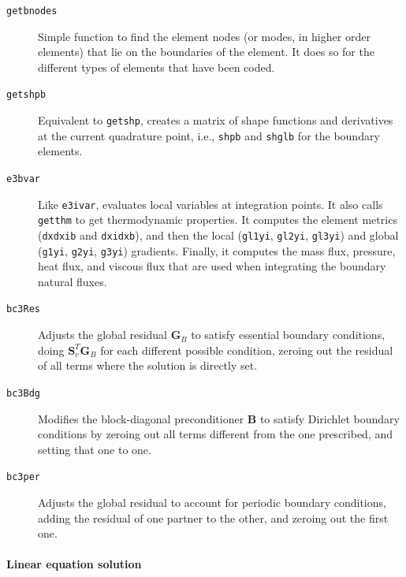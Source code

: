 \documentclass{ucb}
\begin{document}
\begin{description}
    \item[\texttt{getbnodes}] Simple function to find the element nodes (or modes, in higher order elements) that lie on the boundaries of the element. It does so for the different types of elements that have been coded.
    
    \item[\texttt{getshpb}] Equivalent to \texttt{getshp},  creates a matrix of shape functions and derivatives at the current quadrature point, i.e., \texttt{shpb} and \texttt{shglb} for the boundary elements.
    
    \item[\texttt{e3bvar}] Like \texttt{e3ivar}, evaluates local variables at integration points. It also calls \texttt{getthm} to get thermodynamic properties. It computes the element metrics (\texttt{dxdxib} and \texttt{dxidxb}), and then the local (\texttt{gl1yi}, \texttt{gl2yi}, \texttt{gl3yi}) and global (\texttt{g1yi}, \texttt{g2yi}, \texttt{g3yi}) gradients. Finally, it computes the mass flux, pressure, heat flux, and viscous flux that are used when integrating the boundary natural fluxes.
    
    \item[\texttt{bc3Res}] Adjusts the global residual $\bm{G}_B$ to satisfy essential boundary conditions, doing $\bm{S}_v^T\bm{G}_B$ for each different possible condition, zeroing out the residual of all terms where the solution is directly set.
    
    \item[\texttt{bc3Bdg}] Modifies the block-diagonal preconditioner $\bm{B}$ to satisfy Dirichlet boundary conditions by zeroing out all terms different from the one prescribed, and setting that one to one.
    
    \item[\texttt{bc3per}] Adjusts the global residual to account for periodic boundary conditions, adding the residual of one partner to the other, and zeroing out the first one.
            
\end{description}

\paragraph{Linear equation solution}
\end{document}
